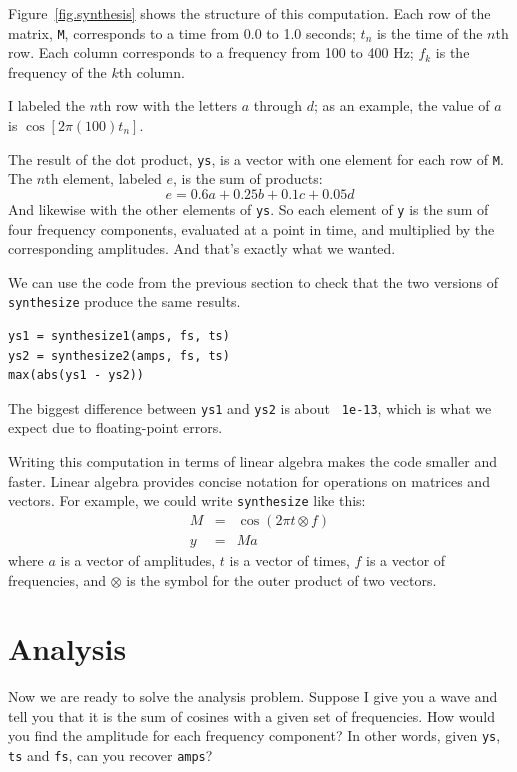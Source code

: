 \documentclass[12pt]{book}
\begin{document}
Figure~\ref{fig.synthesis} shows the structure of this computation.
Each row of the matrix, {\tt M}, corresponds to a time 
from 0.0 to 1.0 seconds; $t_n$ is the time of the $n$th row.
Each column corresponds to a frequency from
100 to 400 Hz; $f_k$ is the frequency of the $k$th column.

I labeled the $n$th row with the letters $a$ through $d$; as an
example, the value of $a$ is $\cos [2 \pi (100) t_n]$.

The result of the dot product, {\tt ys}, is a vector with one element
for each row of {\tt M}.  The $n$th element, labeled $e$, is the sum
of products:
%
\[ e = 0.6 a + 0.25 b + 0.1 c + 0.05 d \]
%
And likewise with the other elements of {\tt ys}.  So each element
of {\tt y} is the sum of four frequency components, evaluated at
a point in time, and multiplied by the corresponding amplitudes.
And that's exactly what we wanted.

We can use the code from the previous section to check that the two
versions of {\tt synthesize} produce the same results.

\begin{verbatim}
ys1 = synthesize1(amps, fs, ts)
ys2 = synthesize2(amps, fs, ts)
max(abs(ys1 - ys2))
\end{verbatim}

The biggest difference between {\tt ys1} and {\tt ys2} is about {\tt
  1e-13}, which is what we expect due to floating-point errors.

Writing this computation in terms of linear algebra makes the code
smaller and faster.  Linear algebra
provides concise notation for operations on matrices and vectors.  For
example, we could write {\tt synthesize} like this:
%
\begin{eqnarray*}
M &=& \cos (2 \pi t \otimes f) \\
y &=& M a
\end{eqnarray*}
%
where $a$ is a vector of amplitudes,
$t$ is a vector of times, $f$ is a vector of frequencies, and
$\otimes$ is the symbol for the outer product of two vectors.


\section{Analysis}
\label{analysis}

Now we are ready to solve the analysis problem.  Suppose I give you
a wave and tell you that it is the sum of cosines with a given set
of frequencies.  How would you find the amplitude for each frequency
component?  In other words, given {\tt ys}, {\tt ts} and {\tt fs},
can you recover {\tt amps}?
\end{document}
